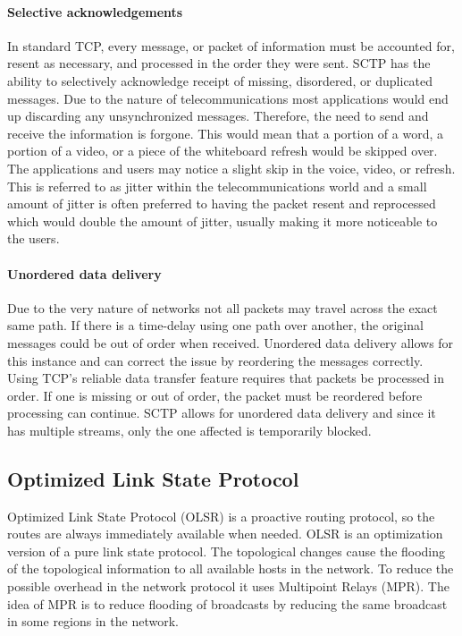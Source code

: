 \documentclass[a4paper]{article}
\begin{document}
\paragraph{Selective acknowledgements}
In standard TCP, every message, or packet of information must be accounted for, resent as necessary, and processed in the order they were sent. SCTP has the ability to selectively acknowledge receipt of missing, disordered, or duplicated messages. Due to the nature of telecommunications most applications would end up discarding any unsynchronized messages. Therefore, the need to send and receive the information is forgone. This would mean that a portion of a word, a portion of a video, or a piece of the whiteboard refresh would be skipped over. The applications and users may notice a slight skip in the voice, video, or refresh. This is referred to as jitter within the telecommunications world and a small amount of jitter is often preferred to having the packet resent and reprocessed which would double the amount of jitter, usually making it more noticeable to the users.

\paragraph{Unordered data delivery}
Due to the very nature of networks not all packets may travel across the exact same path. If there is a time-delay using one path over another, the original messages could be out of order when received. Unordered data delivery allows for this instance and can correct the issue by reordering the messages correctly. Using TCP’s reliable data transfer feature requires that packets be processed in order. If one is missing or out of order, the packet must be reordered before processing can continue. SCTP allows for unordered data delivery and since it has multiple streams, only the one affected is temporarily blocked.

\subsection{Optimized Link State Protocol}
Optimized Link State Protocol (OLSR) is a proactive routing protocol, so the routes are always immediately available when needed. OLSR is an optimization version of a pure link state protocol. The topological changes cause the flooding of the topological information to all available hosts in the network. To reduce the possible overhead in the network protocol it uses Multipoint Relays (MPR). The idea of MPR is to reduce flooding of broadcasts by reducing the same broadcast in some regions in the network.
\end{document}
